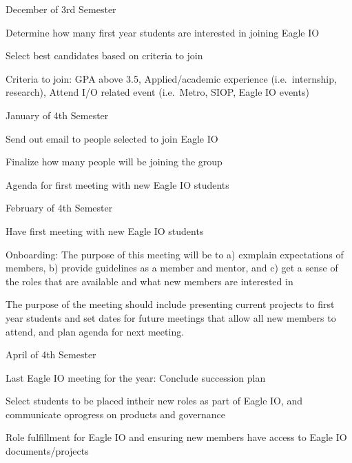 \documentclass[
]{book}
\begin{document}
December of 3rd Semester

Determine how many first year students are interested in joining Eagle IO

Select best candidates based on criteria to join

Criteria to join: GPA above 3.5, Applied/academic experience (i.e.~internship, research), Attend I/O related event (i.e.~Metro, SIOP, Eagle IO events)

January of 4th Semester

Send out email to people selected to join Eagle IO

Finalize how many people will be joining the group

Agenda for first meeting with new Eagle IO students

February of 4th Semester

Have first meeting with new Eagle IO students

Onboarding: The purpose of this meeting will be to a) exmplain expectations of members, b) provide guidelines as a member and mentor, and c) get a sense of the roles that are available and what new members are interested in

The purpose of the meeting should include presenting current projects to first year students and set dates for future meetings that allow all new members to attend, and plan agenda for next meeting.

April of 4th Semester

Last Eagle IO meeting for the year: Conclude succession plan

Select students to be placed intheir new roles as part of Eagle IO, and communicate oprogress on products and governance

Role fulfillment for Eagle IO and ensuring new members have access to Eagle IO documents/projects

  
\end{document}
